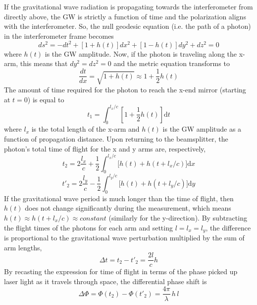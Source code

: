 	If the gravitational wave radiation is propagating towards the interferometer from directly above, the GW is strictly a function of time and the polarization aligns with the interferometer. So, the null geodesic equation (i.e. the path of a photon) in the interferometer frame becomes \cite{Saulson}
	\begin{equation}
	ds^2  = -dt^2 + [1+h(t)]  dx^2 + [1-h(t)]  dy^2 + dz^2 = 0
	\end{equation}
	where $h(t)$ is the GW amplitude. Now, if the photon is traveling along the x-arm, this means that $dy^2 = dz^2 = 0$ and the metric equation transforms to
	\begin{equation}
	\frac{dt}{dx} = \sqrt{ 1+h(t) } \approx 1+\frac{1}{2} h(t)
	\end{equation}
	The amount of time required for the photon to reach the x-end mirror (starting at $t=0$) is equal to
	\begin{equation}\label{pathlength}
	t_1 = \int_{0}^{l_{x}/c} [1+\frac{1}{2}  h(t) ] \text{d}t
	\end{equation}
	where $l_x$ is the total length of the x-arm and $h(t)$ is the GW amplitude as a function of propagation distance.  Upon returning to the beamsplitter, the photon's total time of flight for the x and y arms are, respectively,
	\begin{equation}
	t_2 = 2 \frac{l_x}{c} + \frac{1}{2} \int_{0}^{l_x/c} \bigg[  h(t) +  h(t + l_x/c)  \bigg] \text{d}x
	\end{equation}
	\begin{equation}
	t'_{2}= 2 \frac{l_y}{c} - \frac{1}{2} \int_{0}^{l_y/c} \bigg[  h(t) +  h(t + l_y/c)  \bigg] \text{d}y
	\end{equation}
	If the gravitational wave period is much longer than the time of flight, then $h(t)$ does not change significantly during the measurement, which means $h(t) \approx h(t+ l_{x}/c) \approx constant$ (similarly for the y-direction).  By subtracting the flight times of the photons for each arm and setting $l = l_x = l_y$, the difference is proportional to the gravitational wave perturbation multiplied by the sum of arm lengths,
	\begin{equation}
	\Delta t = t_2 - t'_{2} = \frac{2l}{c} h
	\end{equation}
	By recasting the expression for time of flight in terms of the phase picked up laser light as it travels through space, the differential phase shift is \cite{Saulson}
	\begin{equation}\label{diffphase}
	\Delta \Phi = \Phi(t_{2}) - \Phi(t'_{2}) = \frac{4 \pi}{\lambda} \, h \, l
	\end{equation}
